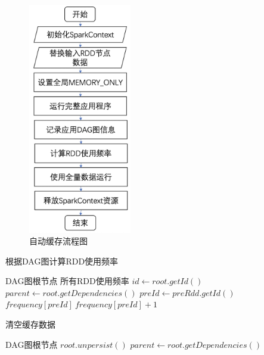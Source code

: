 \begin{figure}[htbp]
    \centering
    \includegraphics[width=0.4\textwidth]{Img/auto-cache.jpg}
    \caption{自动缓存流程图}
    \label{fig:auto-cache}
\end{figure}

\begin{algorithm}  
    \caption{根据DAG图计算RDD使用频率}  
    \begin{algorithmic}[1] %
        \Require DAG图根节点
        \Ensure 所有RDD使用频率
            \State $id \gets root.getId()$
            \State $parent \gets root.getDependencies()$
                \State $preId \gets preRdd.getId()$
                \State $frequency[preId] \ frequency[preId] + 1$
                \State {}
            \EndFor
        \EndFunction  
    \end{algorithmic}
    \label{alg:cal-fre}
\end{algorithm}

\begin{algorithm}  
    \caption{清空缓存数据}  
    \begin{algorithmic}[1] %
        \Require DAG图根节点
            \State $root.unpersist()$
            \State $parent \gets root.getDependencies()$
                \State {}
            \EndFor
        \EndFunction
    \end{algorithmic}
    \label{alg:clean-cache}
\end{algorithm}


